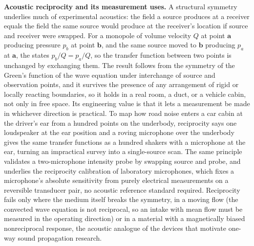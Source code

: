 \begin{mastery}
\textbf{Acoustic reciprocity and its measurement uses.} A structural
symmetry underlies much of experimental acoustics: the field a source
produces at a receiver equals the field the same source would produce at the
receiver's location if source and receiver were swapped. For a monopole of
volume velocity $Q$ at point $\mathbf{a}$ producing pressure $p_b$ at point
$\mathbf{b}$, and the same source moved to $\mathbf{b}$ producing $p_a$ at
$\mathbf{a}$, the  states $p_b/Q = p_a/Q$, so
the transfer function between two points is unchanged by exchanging them. The
result follows from the symmetry of the Green's function of the wave equation
under interchange of source and observation points, and it survives the
presence of any arrangement of rigid or locally reacting boundaries, so it
holds in a real room, a duct, or a vehicle cabin, not only in free space. Its
engineering value is that it lets a measurement be made in whichever
direction is practical. To map how road noise enters a car cabin at the
driver's ear from a hundred points on the underbody, reciprocity says one
loudspeaker at the ear position and a roving microphone over the underbody
gives the same transfer functions as a hundred shakers with a microphone at
the ear, turning an impractical survey into a single-source scan. The same
principle validates a two-microphone intensity probe by swapping source and
probe, and underlies the reciprocity calibration of laboratory microphones,
which fixes a microphone's absolute sensitivity from purely electrical
measurements on a reversible transducer pair, no acoustic reference standard
required. Reciprocity fails only where the medium itself breaks the symmetry,
in a moving flow (the convected wave equation is not reciprocal, so an
intake with mean flow must be measured in the operating direction) or in a
material with a magnetically biased nonreciprocal response, the acoustic
analogue of the devices that motivate one-way sound propagation research.
\end{mastery}

